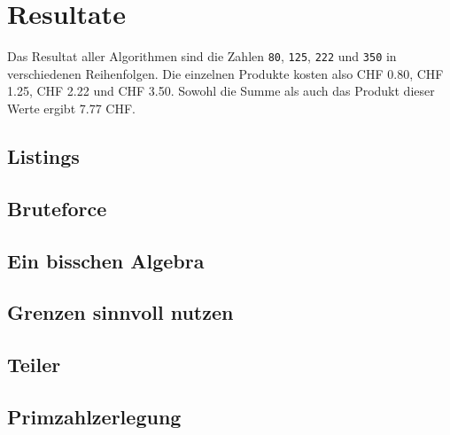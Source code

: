 \documentclass[10pt, fleqn]{article}
\begin{document}


\section{Resultate}
Das Resultat aller Algorithmen sind die Zahlen \verb!80!, \verb!125!, 
\verb!222! und \verb!350! in verschiedenen Reihenfolgen. 
Die einzelnen Produkte kosten also CHF 0.80, CHF 1.25, CHF 2.22 und CHF 3.50. 
Sowohl die Summe als auch das Produkt dieser Werte ergibt 7.77 CHF. 
\clearpage
\begin{appendices}
  \section{Listings}

  \subsection{Bruteforce}
  

  \subsection{Ein bisschen Algebra}
  

  \subsection{Grenzen sinnvoll nutzen}
  

  \subsection{Teiler}
  

  \subsection{Primzahlzerlegung}
  
\end{appendices}
\end{document}
